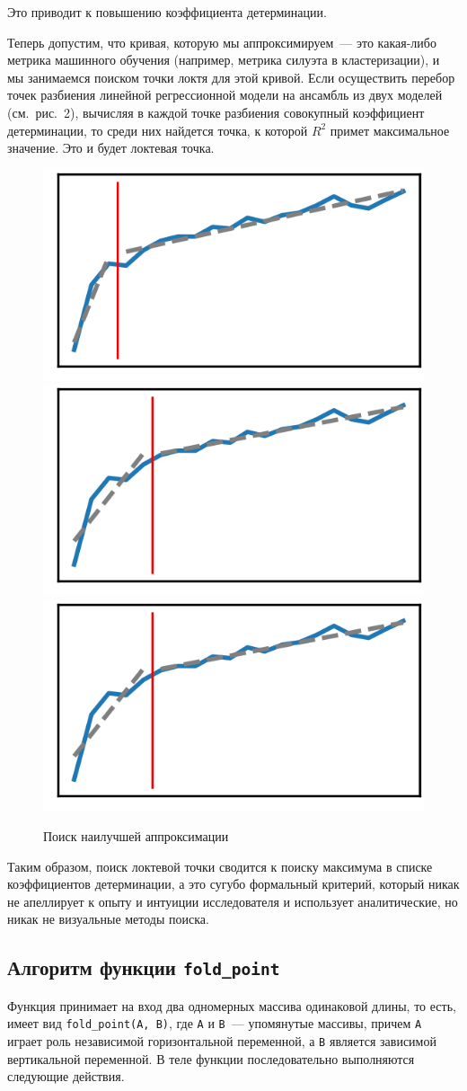 \documentclass[a4paper,12pt]{article}
\begin{document}
Это приводит к повышению коэффициента детерминации. 

Теперь допустим, что кривая, которую мы аппроксимируем — это какая-либо метрика машинного обучения (например, метрика силуэта в кластеризации), и мы занимаемся поиском точки локтя для этой кривой. Если осуществить перебор точек разбиения линейной регрессионной модели на ансамбль из двух моделей (см. рис. 2), вычисляя в каждой точке разбиения совокупный коэффициент детерминации, то среди них найдется точка, к которой $R^2$ примет максимальное значение. Это и будет локтевая точка.

\begin{figure}[!h]
	\centering
	\includegraphics[width=0.25\linewidth]{pictures/1 итерация}
	\hspace{0.01\linewidth}
	\includegraphics[width=0.25\linewidth]{pictures/2 итерация}
	\hspace{0.01\linewidth}
	\includegraphics[width=0.25\linewidth]{pictures/2 итерация}
	\\
	\caption{Поиск наилучшей аппроксимации}
\end{figure}
Таким образом, поиск локтевой точки сводится к поиску максимума в списке коэффициентов детерминации, а это сугубо формальный критерий, который никак не апеллирует к опыту и интуиции исследователя и использует аналитические, но никак не визуальные методы поиска.

\subsection{Алгоритм функции \texttt{fold\_point}}
Функция принимает на вход два одномерных массива одинаковой длины, то есть, имеет вид \texttt{fold\_point(A, B)}, где \texttt{A} и \texttt{B} — упомянутые массивы, причем \texttt{A} играет роль независимой горизонтальной переменной, а \texttt{B} является зависимой вертикальной переменной.
В теле функции последовательно выполняются следующие действия.
\end{document}
